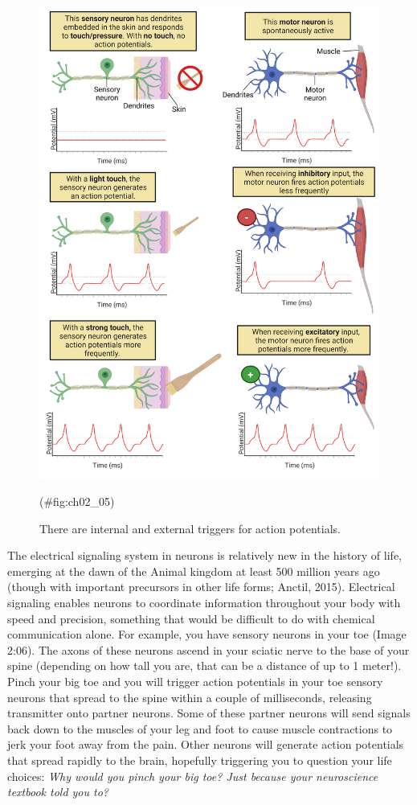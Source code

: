 \documentclass[
]{book}
\begin{document}
\begin{figure}

{\centering \includegraphics[width=0.8\linewidth]{images/ch02/02_05} 

}

\caption{There are internal and external triggers for action potentials.}(\#fig:ch02_05)
\end{figure}

The electrical signaling system in neurons is relatively new in the history of life, emerging at the dawn of the Animal kingdom at least 500 million years ago (though with important precursors in other life forms; Anctil, 2015). Electrical signaling enables neurons to coordinate information throughout your body with speed and precision, something that would be difficult to do with chemical communication alone. For example, you have sensory neurons in your toe (Image 2:06). The axons of these neurons ascend in your sciatic nerve to the base of your spine (depending on how tall you are, that can be a distance of up to 1 meter!). Pinch your big toe and you will trigger action potentials in your toe sensory neurons that spread to the spine within a couple of milliseconds, releasing transmitter onto partner neurons. Some of these partner neurons will send signals back down to the muscles of your leg and foot to cause muscle contractions to jerk your foot away from the pain. Other neurons will generate action potentials that spread rapidly to the brain, hopefully triggering you to question your life choices: \emph{Why would you pinch your big toe? Just because your neuroscience textbook told you to?}
\end{document}
